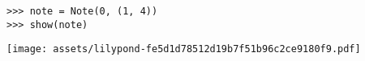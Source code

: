 \begin{comment}
<abjad>
note = Note(0, (1, 4))
show(note)
</abjad>
\end{comment}

\begin{lstlisting}
>>> note = Note(0, (1, 4))
>>> show(note)
\end{lstlisting}
\noindent\texttt{[image: assets/lilypond-fe5d1d78512d19b7f51b96c2ce9180f9.pdf]}
